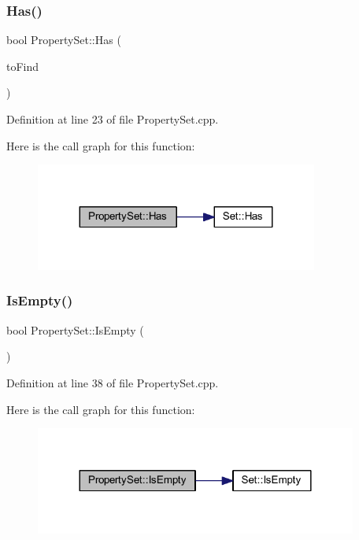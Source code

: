\subsubsection{\texorpdfstring{Has()}{Has()}}
{\footnotesize\ttfamily bool Property\+Set\+::\+Has (\begin{DoxyParamCaption}\item[{wx\+P\+G\+Property $\ast$}]{to\+Find }\end{DoxyParamCaption})}



Definition at line 23 of file Property\+Set.\+cpp.

Here is the call graph for this function\+:\nopagebreak
\begin{figure}[H]
\begin{center}
\leavevmode
\includegraphics[width=263pt]{class_property_set_affec0e3a12cfab591a5ea8821244aa60_cgraph}
\end{center}
\end{figure}
\mbox{\label{class_property_set_a74caf43bdcc3717836a3130d6c3dad18}} 
\subsubsection{\texorpdfstring{Is\+Empty()}{IsEmpty()}}
{\footnotesize\ttfamily bool Property\+Set\+::\+Is\+Empty (\begin{DoxyParamCaption}{ }\end{DoxyParamCaption})}



Definition at line 38 of file Property\+Set.\+cpp.

Here is the call graph for this function\+:\nopagebreak
\begin{figure}[H]
\begin{center}
\leavevmode
\includegraphics[width=300pt]{class_property_set_a74caf43bdcc3717836a3130d6c3dad18_cgraph}
\end{center}
\end{figure}
\mbox{\label{class_property_set_a388cd14ca61a4656e740b14831507108}} 
